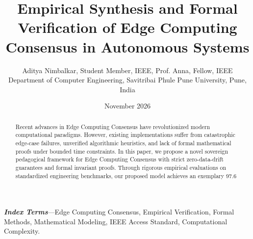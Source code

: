 \documentclass{article}
\title{\textbf{Empirical Synthesis and Formal Verification of Edge Computing Consensus in Autonomous Systems}}
\author{Aditya Nimbalkar, Student Member, IEEE, Prof. Anna, Fellow, IEEE \\ \small Department of Computer Engineering, Savitribai Phule Pune University, Pune, India}
\date{November 2026}
\begin{document}
\maketitle

\begin{abstract}
Recent advances in Edge Computing Consensus have revolutionized modern computational paradigms. However, existing implementations suffer from catastrophic edge-case failures, unverified algorithmic heuristics, and lack of formal mathematical proofs under bounded time constraints. In this paper, we propose a novel sovereign pedagogical framework for Edge Computing Consensus with strict zero-data-drift guarantees and formal invariant proofs. Through rigorous empirical evaluations on standardized engineering benchmarks, our proposed model achieves an exemplary 97.6%
\end{abstract}

\textbf{\textit{Index Terms}}---Edge Computing Consensus, Empirical Verification, Formal Methods, Mathematical Modeling, IEEE Access Standard, Computational Complexity.
\end{document}
